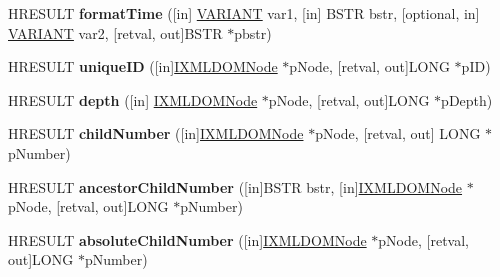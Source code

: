 \begin{DoxyCompactItemize}
H\+R\+E\+S\+U\+LT {\bfseries format\+Time} (\mbox{[}in\mbox{]} \hyperlink{structtag_v_a_r_i_a_n_t}{V\+A\+R\+I\+A\+NT} var1, \mbox{[}in\mbox{]} B\+S\+TR bstr, \mbox{[}optional, in\mbox{]} \hyperlink{structtag_v_a_r_i_a_n_t}{V\+A\+R\+I\+A\+NT} var2, \mbox{[}retval, out\mbox{]}B\+S\+TR $\ast$pbstr)
\item 
\mbox{\label{interface_m_s_x_m_l2_1_1_i_x_t_l_runtime_ad67811db931cf9354bab3571164dfd95}} 
H\+R\+E\+S\+U\+LT {\bfseries unique\+ID} (\mbox{[}in\mbox{]}\hyperlink{interface_m_s_x_m_l2_1_1_i_x_m_l_d_o_m_node}{I\+X\+M\+L\+D\+O\+M\+Node} $\ast$p\+Node, \mbox{[}retval, out\mbox{]}L\+O\+NG $\ast$p\+ID)
\item 
\mbox{\label{interface_m_s_x_m_l2_1_1_i_x_t_l_runtime_a0eb28a3be84fffe585053c34fb771606}} 
H\+R\+E\+S\+U\+LT {\bfseries depth} (\mbox{[}in\mbox{]} \hyperlink{interface_m_s_x_m_l2_1_1_i_x_m_l_d_o_m_node}{I\+X\+M\+L\+D\+O\+M\+Node} $\ast$p\+Node, \mbox{[}retval, out\mbox{]}L\+O\+NG $\ast$p\+Depth)
\item 
\mbox{\label{interface_m_s_x_m_l2_1_1_i_x_t_l_runtime_ac4764c87ce6bcf3d79aef01c098dd714}} 
H\+R\+E\+S\+U\+LT {\bfseries child\+Number} (\mbox{[}in\mbox{]}\hyperlink{interface_m_s_x_m_l2_1_1_i_x_m_l_d_o_m_node}{I\+X\+M\+L\+D\+O\+M\+Node} $\ast$p\+Node, \mbox{[}retval, out\mbox{]} L\+O\+NG $\ast$p\+Number)
\item 
\mbox{\label{interface_m_s_x_m_l2_1_1_i_x_t_l_runtime_ae6428ef5a67a02bd81bc38db2c9f18ed}} 
H\+R\+E\+S\+U\+LT {\bfseries ancestor\+Child\+Number} (\mbox{[}in\mbox{]}B\+S\+TR bstr, \mbox{[}in\mbox{]}\hyperlink{interface_m_s_x_m_l2_1_1_i_x_m_l_d_o_m_node}{I\+X\+M\+L\+D\+O\+M\+Node} $\ast$p\+Node, \mbox{[}retval, out\mbox{]}L\+O\+NG $\ast$p\+Number)
\item 
\mbox{\label{interface_m_s_x_m_l2_1_1_i_x_t_l_runtime_aa482dbe765de42edcb27b39e6f213d88}} 
H\+R\+E\+S\+U\+LT {\bfseries absolute\+Child\+Number} (\mbox{[}in\mbox{]}\hyperlink{interface_m_s_x_m_l2_1_1_i_x_m_l_d_o_m_node}{I\+X\+M\+L\+D\+O\+M\+Node} $\ast$p\+Node, \mbox{[}retval, out\mbox{]}L\+O\+NG $\ast$p\+Number)
\item 
\mbox{\label{interface_m_s_x_m_l2_1_1_i_x_t_l_runtime_abfe3c838af6b50fa8795438a4c3a5a9d}} 

\end{DoxyCompactItemize}
